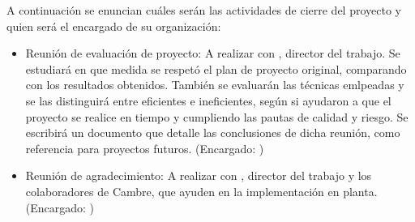 \documentclass[
11pt, %
]{charter}
\begin{document}
A continuación se enuncian cuáles serán las actividades de cierre del proyecto y quien será el encargado de su organización:

\begin{itemize}
	\item Reunión de evaluación de proyecto: A realizar con \supname , director del trabajo. Se estudiará en que medida se respetó el plan de proyecto original, comparando con los resultados obtenidos. También se evaluarán las técnicas emlpeadas y se las distinguirá entre eficientes e ineficientes, según si ayudaron a que el proyecto se realice en tiempo y cumpliendo las pautas de calidad y riesgo. Se escribirá un documento que detalle las conclusiones de dicha reunión, como referencia para proyectos futuros. (Encargado: \authorname) 
	\item Reunión de agradecimiento: A realizar con \supname , director del trabajo y los colaboradores de Cambre, que ayuden en la implementación en planta. (Encargado: \authorname)
\end{itemize}
\end{document}
